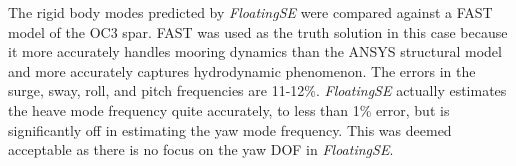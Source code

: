 The rigid body modes predicted by \textit{FloatingSE} were compared
against a FAST model of the OC3 spar.  FAST was used as the truth
solution in this case because it more accurately handles mooring
dynamics than the ANSYS structural model and more accurately captures
hydrodynamic phenomenon.  The errors in the surge, sway, roll, and pitch
frequencies are 11-12\%.  \textit{FloatingSE} actually estimates the
heave mode frequency quite accurately, to less than 1\% error, but is
significantly off in estimating the yaw mode frequency.  This was deemed
acceptable as there is no focus on the yaw DOF in \textit{FloatingSE}.



